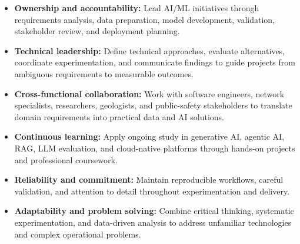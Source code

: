 \documentclass[9pt,letterpaper]{extarticle}
\begin{document}
\begin{itemize}
\item \textbf{Ownership and accountability:} Lead AI/ML initiatives through requirements analysis, data preparation, model development, validation, stakeholder review, and deployment planning.
\item \textbf{Technical leadership:} Define technical approaches, evaluate alternatives, coordinate experimentation, and communicate findings to guide projects from ambiguous requirements to measurable outcomes.
\item \textbf{Cross-functional collaboration:} Work with software engineers, network specialists, researchers, geologists, and public-safety stakeholders to translate domain requirements into practical data and AI solutions.
\item \textbf{Continuous learning:} Apply ongoing study in generative AI, agentic AI, RAG, LLM evaluation, and cloud-native platforms through hands-on projects and professional coursework.
\item \textbf{Reliability and commitment:} Maintain reproducible workflows, careful validation, and attention to detail throughout experimentation and delivery.
\item \textbf{Adaptability and problem solving:} Combine critical thinking, systematic experimentation, and data-driven analysis to address unfamiliar technologies and complex operational problems.
\end{itemize}
\end{document}
